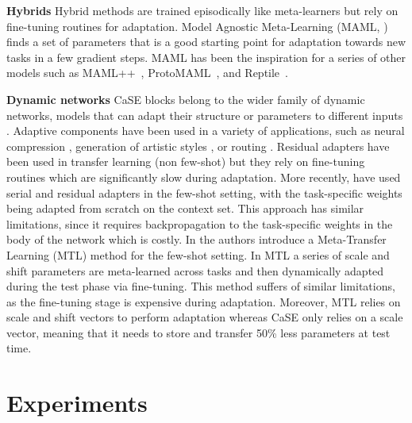 \documentclass{article}
\begin{document}
\textbf{Hybrids} Hybrid methods are trained episodically like meta-learners but rely on fine-tuning routines for adaptation. 
Model Agnostic Meta-Learning (MAML, \citealt{finn2017model}) finds a set of parameters that is a good starting point for adaptation towards new tasks in a few gradient steps. MAML has been the inspiration for a series of other models such as MAML++~\citep{antoniou2018train}, ProtoMAML~\citep{triantafillou2019meta}, and Reptile~\citep{nichol2018first}. 

\textbf{Dynamic networks} CaSE blocks belong to the wider family of dynamic networks, models that can adapt their structure or parameters to different inputs \citep{han2021dynamic}. Adaptive components have been used in a variety of applications, such as neural compression \citep{veit2018convolutional, wu2018blockdrop}, generation of artistic styles \citep{dumoulin2016learned, huang2017arbitrary}, or routing \citep{guo2019spottune}. Residual adapters \citep{rebuffi2017learning, rebuffi2018efficient} have been used in transfer learning (non few-shot) but they rely on fine-tuning routines which are significantly slow during adaptation.
More recently, \cite{li2022cross} have used serial and residual adapters in the few-shot setting, with the task-specific weights being adapted from scratch on the context set. This approach has similar limitations, since it requires backpropagation to the task-specific weights in the body of the network which is costly. In \cite{sun2019meta} the authors introduce a Meta-Transfer Learning (MTL) method for the few-shot setting. In MTL a series of scale and shift parameters are meta-learned across tasks and then dynamically adapted during the test phase via fine-tuning. This method suffers of similar limitations, as the fine-tuning stage is expensive during adaptation. Moreover, MTL relies on  scale and shift vectors to perform adaptation whereas CaSE only relies on a scale vector, meaning that it needs to store and transfer 50\% less parameters at test time.

\section{Experiments} \label{sec:experiments}
\end{document}
